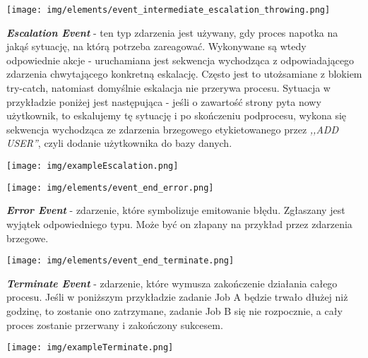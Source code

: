 \documentclass[declaration,shortabstract,mgr]{iithesis}
\begin{document}
\vspace{\mypointsep}

\noindent\begin{minipage}[t]{0.075\textwidth}\vspace{0pt}
\texttt{[image: img/elements/event\_intermediate\_escalation\_throwing.png]}
\end{minipage}\hfill
\begin{minipage}[t]{0.875\textwidth}\vspace{0pt}
\textbf{\textit{Escalation Event}} - ten typ zdarzenia jest używany, gdy proces napotka na jakąś sytuację, na którą potrzeba zareagować. Wykonywane są wtedy odpowiednie akcje - uruchamiana jest sekwencja wychodząca z odpowiadającego zdarzenia chwytającego konkretną eskalację. Często jest to utożsamiane z blokiem try-catch, natomiast domyślnie eskalacja nie przerywa procesu. Sytuacja w przykładzie poniżej jest następująca - jeśli o zawartość strony pyta nowy użytkownik, to eskalujemy tę sytuację i po skończeniu podprocesu, wykona się sekwencja wychodząca ze zdarzenia brzegowego etykietowanego przez \textit{,,ADD USER''}, czyli dodanie użytkownika do bazy danych.
\begin{center}
\texttt{[image: img/exampleEscalation.png]}
\end{center}
\end{minipage}

\vspace{\mypointsep}

\noindent\begin{minipage}[t]{0.075\textwidth}\vspace{0pt}
\texttt{[image: img/elements/event\_end\_error.png]}
\end{minipage}\hfill
\begin{minipage}[t]{0.875\textwidth}\vspace{0pt}
\textbf{\textit{Error Event}} - zdarzenie, które symbolizuje emitowanie błędu. Zgłaszany jest wyjątek odpowiedniego typu. Może być on złapany na przykład przez zdarzenia brzegowe.
\end{minipage}

\vspace{\mypointsep}

\noindent\begin{minipage}[t]{0.075\textwidth}\vspace{0pt}
\texttt{[image: img/elements/event\_end\_terminate.png]}
\end{minipage}\hfill
\begin{minipage}[t]{0.875\textwidth}\vspace{0pt}
\textbf{\textit{Terminate Event}} - zdarzenie, które wymusza zakończenie działania całego procesu. Jeśli w poniższym przykładzie zadanie Job A będzie trwało dłużej niż godzinę, to zostanie ono zatrzymane, zadanie Job B się nie rozpocznie, a cały proces zostanie przerwany i zakończony sukcesem.
\begin{center}
\texttt{[image: img/exampleTerminate.png]}
\end{center}
\end{minipage}
\end{document}

